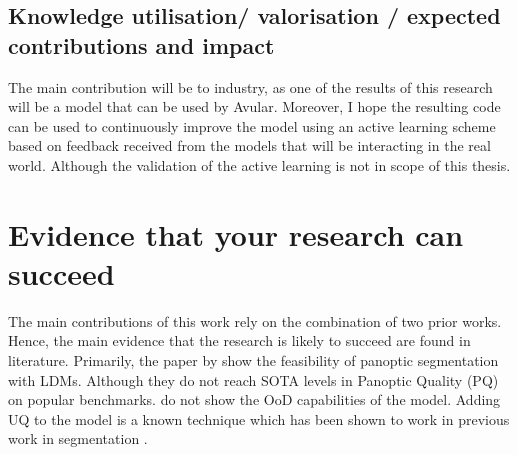 \documentclass{article}
\begin{document}
\subsection{Knowledge utilisation/ valorisation / expected contributions and impact}

The main contribution will be to industry, as one of the results of this research will be a model that can be used by Avular. Moreover, I hope the resulting code can be used to continuously improve the model using an active learning scheme based on feedback received from the models that will be interacting in the real world. Although the validation of the active learning is not in scope of this thesis.





\section{Evidence that your research can succeed}\label{sec:evidence}

The main contributions of this work rely on the combination of two prior works. Hence, the main evidence that the research is likely to succeed are found in literature. Primarily, the paper by \citep{vangansbeke2024ldmseg} show the feasibility of panoptic segmentation with LDMs. Although they do not reach SOTA levels in Panoptic Quality (PQ) \cite{kirillov2019panoptic} on popular benchmarks. \cite{vangansbeke2024ldmseg} do not show the OoD capabilities of the model. Adding UQ to the model is a known technique which has been shown to work in previous work in segmentation \cite{osti_1481629, tanno2021uncertainty}.
\end{document}
